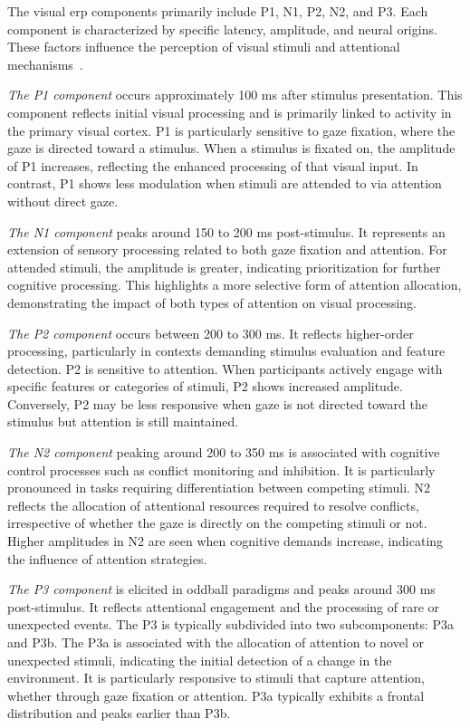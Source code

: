 The visual \ac{erp} components primarily include P1, N1, P2, N2, and P3.
Each component is characterized by specific latency, amplitude, and neural
origins.
These factors influence the perception of visual stimuli and attentional
mechanisms~\cite{Luck2013}.

\emph{The P1 component} occurs approximately 100 ms after stimulus presentation.
This component reflects initial visual processing and is primarily linked to
activity in the primary visual cortex.
P1 is particularly sensitive to gaze fixation, where the gaze is directed
toward a stimulus.
When a stimulus is fixated on, the amplitude of P1 increases, reflecting the
enhanced processing of that visual input.
In contrast, P1 shows less modulation when stimuli are attended to via
attention without direct gaze.

\emph{The N1 component} peaks around 150 to 200 ms post-stimulus.
It represents an extension of sensory processing related to both gaze fixation
and attention.
For attended stimuli, the amplitude is greater, indicating prioritization for
further cognitive processing.
This highlights a more selective form of attention allocation, demonstrating
the impact of both types of attention on visual processing.

\emph{The P2 component} occurs between 200 to 300 ms.
It reflects higher-order processing, particularly in contexts demanding
stimulus evaluation and feature detection.
P2 is sensitive to attention.
When participants actively engage with specific features or categories of
stimuli, P2 shows increased amplitude.
Conversely, P2 may be less responsive when gaze is not directed toward the
stimulus but attention is still maintained.

\emph{The N2 component} peaking around 200 to 350 ms is associated with cognitive
control processes such as conflict monitoring and inhibition.
It is particularly pronounced in tasks requiring differentiation between
competing stimuli.
N2 reflects the allocation of attentional resources required to resolve
conflicts, irrespective of whether the gaze is directly on the competing
stimuli or not.
Higher amplitudes in N2 are seen when cognitive demands increase, indicating
the influence of attention strategies.

\emph{The P3 component} is elicited in oddball paradigms and peaks around 300 ms
post-stimulus.
It reflects attentional engagement and the processing of rare or unexpected
events.
The P3 is typically subdivided into two subcomponents: P3a and P3b.
The P3a is associated with the allocation of attention to novel or unexpected
stimuli, indicating the initial detection of a change in the environment.
It is particularly responsive to stimuli that capture attention, whether
through gaze fixation or attention.
P3a typically exhibits a frontal distribution and peaks earlier than P3b.

